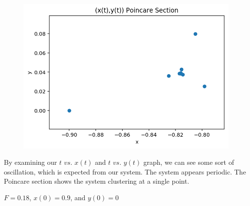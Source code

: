 \documentclass{article}
\begin{document}
\begin{figure}[h!]
\includegraphics[scale=0.4]{poincare1.png}
\end{figure}

By examining our $t\,\, vs.\,\, x(t)$ and $t\,\, vs.\,\, y(t)$ graph, we can see some sort of oscillation, which is expected from our system. The system appears periodic. The Poincare section shows the system clustering at a single point.

$F = 0.18$, $x(0) = 0.9$, and $y(0) = 0$
\end{document}
